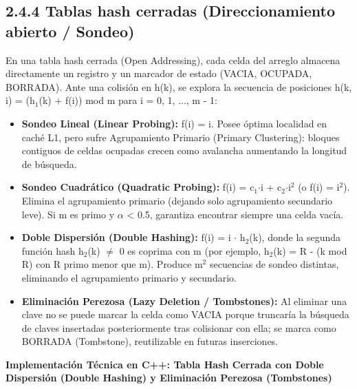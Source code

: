 \documentclass[11pt,letterpaper]{article}
\begin{document}
\subsection*{2.4.4 Tablas hash cerradas (Direccionamiento abierto / Sondeo)}
En una tabla hash cerrada (Open Addressing), cada celda del arreglo almacena directamente un registro y un marcador de estado (VACIA, OCUPADA, BORRADA). Ante una colisión en h(k), se explora la secuencia de posiciones h(k, i) = (h$_1$(k) + f(i)) mod m para i = 0, 1, ..., m - 1:\par
\begin{itemize}
\setlength{\itemsep}{2pt}\setlength{\parskip}{0pt}
  \item \textbf{Sondeo Lineal (Linear Probing): }f(i) = i. Posee óptima localidad en caché L1, pero sufre Agrupamiento Primario (Primary Clustering): bloques contiguos de celdas ocupadas crecen como avalancha aumentando la longitud de búsqueda.
  \item \textbf{Sondeo Cuadrático (Quadratic Probing): }f(i) = c$_1$$\cdot$i + c$_2$$\cdot$i$^2$ (o f(i) = i$^2$). Elimina el agrupamiento primario (dejando solo agrupamiento secundario leve). Si m es primo y $\alpha$ < 0.5, garantiza encontrar siempre una celda vacía.
  \item \textbf{Doble Dispersión (Double Hashing): }f(i) = i $\cdot$ h$_2$(k), donde la segunda función hash h$_2$(k) $\neq$ 0 es coprima con m (por ejemplo, h$_2$(k) = R - (k mod R) con R primo menor que m). Produce m$^2$ secuencias de sondeo distintas, eliminando el agrupamiento primario y secundario.
  \item \textbf{Eliminación Perezosa (Lazy Deletion / Tombstones): }Al eliminar una clave no se puede marcar la celda como VACIA porque truncaría la búsqueda de claves insertadas posteriormente tras colisionar con ella; se marca como BORRADA (Tombstone), reutilizable en futuras inserciones.
\end{itemize}
\vspace{4pt}\noindent\textbf{\color{ipnblue}Implementación Técnica en C++: Tabla Hash Cerrada con Doble Dispersión (Double Hashing) y Eliminación Perezosa (Tombstones)}\par\vspace{-2pt}
\end{document}
